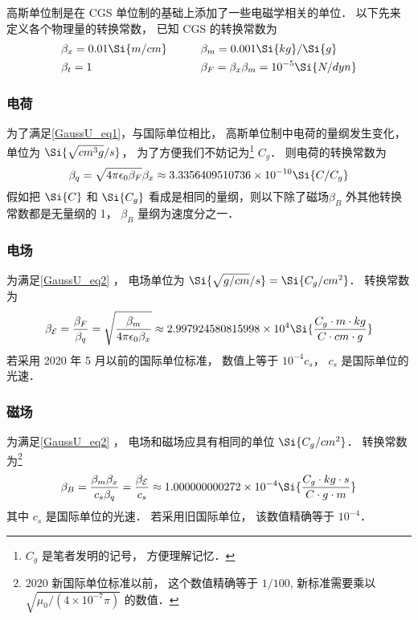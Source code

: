 

高斯单位制是在 CGS 单位制的基础上添加了一些电磁学相关的单位． 以下先来定义各个物理量的转换常数， 
已知 CGS 的转换常数为
\begin{equation}\label{GaussU_eq3}
\begin{aligned}
&\beta_x = 0.01\Si{m/cm} &\qquad &\beta_m = 0.001\Si{kg}/\Si{g}\\
&\beta_t = 1 &\qquad  &\beta_F = \beta_x \beta_m = 10^{-5}\Si{N/dyn}
\end{aligned}
\end{equation}

\subsubsection{电荷}
为了满足\autoref{GaussU_eq1}，与国际单位相比， 高斯单位制中电荷的量纲发生变化， 单位为 $\Si{\sqrt{cm^3 g}/s}$， 为了方便我们不妨记为\footnote{$C_g$ 是笔者发明的记号， 方便理解记忆．} $C_g$． 则电荷的转换常数为
\begin{equation}
\beta_q = \sqrt{4\pi\epsilon_0\beta_F} \beta_x \approx 3.3356409510736\times 10^{-10} \Si{C/C_g}
\end{equation}
假如把 $\Si{C}$ 和 $\Si{C_g}$ 看成是相同的量纲，则以下除了磁场$\beta_B$ 外其他转换常数都是无量纲的 1， $\beta_B$ 量纲为速度分之一．

\subsubsection{电场}
为满足\autoref{GaussU_eq2} ， 电场单位为 $\Si{\sqrt{g/cm}/s} = \Si{C_g/cm^2}$． 转换常数为
\begin{equation}
\beta_{\mathcal E} = \frac{\beta_F}{\beta_q} = \sqrt{\frac{\beta_m}{4\pi\epsilon_0 \beta_x}} \approx 2.997924580815998\times 10^4 \Si{\frac{C_g\cdot m\cdot kg}{C\cdot cm\cdot g}}
\end{equation}
若采用 2020 年 5 月以前的国际单位标准， 数值上等于 $10^{-4} c_{s}$， $c_{s}$ 是国际单位的光速．

\subsubsection{磁场}
为满足\autoref{GaussU_eq2} ， 电场和磁场应具有相同的单位 $\Si{C_g/cm^2}$． 转换常数为\footnote{2020 新国际单位标准以前， 这个数值精确等于 $1/100$, 新标准需要乘以 $\sqrt{\mu_0/(4\times 10^{-7}\pi)}$ 的数值．}
\begin{equation}
\beta_B = \frac{\beta_m\beta_x}{c_s\beta_q} = \frac{\beta_{\mathcal E}}{c_s} \approx 1.000000000272\times 10^{-4} \Si{\frac{C_g\cdot kg \cdot s}{C \cdot g \cdot m}}
\end{equation}
其中 $c_{s}$ 是国际单位的光速． 若采用旧国际单位， 该数值精确等于 $10^{-4}$．

